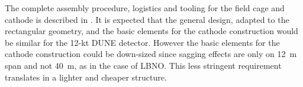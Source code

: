 The complete assembly procedure, logistics and tooling for the field
cage and cathode is described in \anxlbnob.  It is expected that the
general design, adapted to the rectangular geometry, and the basic
elements for the cathode construction would be similar for the 12-kt
DUNE detector.  However the basic elements for the cathode
construction could be down-sized since sagging effects are only on
12~m span and not 40~m, as in the case of LBNO. This less stringent
requirement translates in a lighter and cheaper structure.
